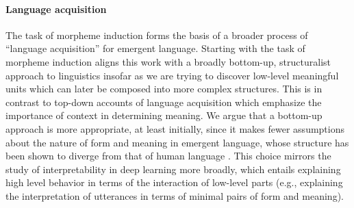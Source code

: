 \paragraph{Language acquisition}
The task of morpheme induction forms the basis of a broader process of ``language acquisition'' for emergent language.
Starting with the task of morpheme induction aligns this work with a broadly bottom-up, structuralist approach to linguistics insofar as we are trying to discover low-level meaningful units which can later be composed into more complex structures.
This is in contrast to top-down accounts of language acquisition which emphasize the importance of context in determining meaning.
We argue that a bottom-up approach is more appropriate, at least initially, since it makes fewer assumptions about the nature of form and meaning in emergent language, whose structure has been shown to diverge from that of human language \citep{kottur2017natural,lake2018generalization,chaabouni2019antiefficient}.
This choice mirrors the study of interpretability in deep learning more broadly, which entails explaining high level behavior in terms of the interaction of low-level parts (e.g., explaining the interpretation of utterances in terms of minimal pairs of form and meaning).
